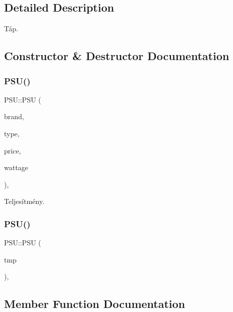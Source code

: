 \subsection{Detailed Description}
Táp. 

\subsection{Constructor \& Destructor Documentation}
\mbox{\label{class_p_s_u_a1077b85dde400327880d6f37ebaeef49}} 
\subsubsection{\texorpdfstring{PSU()}{PSU()}\hspace{0.1cm}{\footnotesize\ttfamily [1/2]}}
{\footnotesize\ttfamily P\+S\+U\+::\+P\+SU (\begin{DoxyParamCaption}\item[{\mbox{\hyperlink{class_string}{String}}}]{brand,  }\item[{\mbox{\hyperlink{class_string}{String}}}]{type,  }\item[{int}]{price,  }\item[{int}]{wattage }\end{DoxyParamCaption})\hspace{0.3cm}{\ttfamily [inline]}, {\ttfamily [explicit]}}



Teljesítmény. 

\mbox{\label{class_p_s_u_ac6b366346dc0d2263a94b832843ab6b2}} 
\subsubsection{\texorpdfstring{PSU()}{PSU()}\hspace{0.1cm}{\footnotesize\ttfamily [2/2]}}
{\footnotesize\ttfamily P\+S\+U\+::\+P\+SU (\begin{DoxyParamCaption}\item[{\mbox{\hyperlink{struct_temp_input}{Temp\+Input}}}]{tmp }\end{DoxyParamCaption})\hspace{0.3cm}{\ttfamily [inline]}, {\ttfamily [explicit]}}



\subsection{Member Function Documentation}
\mbox{\label{class_p_s_u_ad8f95676e09f5ba805dbba50759f44ba}} 
